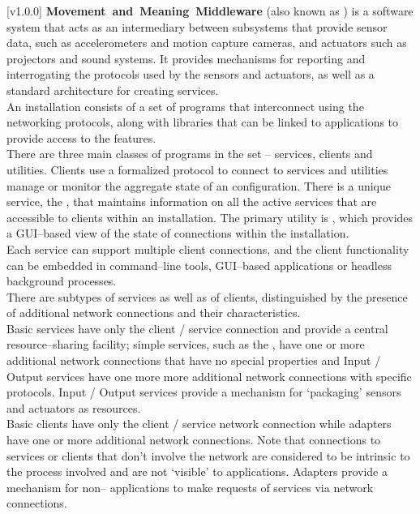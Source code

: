 [v1.0.0]
\textbf{Movement~and~Meaning~Middleware} (also known as \mplusm{}) is a software system
that acts as an intermediary between subsystems that provide sensor data, such as
accelerometers and motion capture cameras, and actuators such as projectors and sound
systems.
It provides mechanisms for reporting and interrogating the protocols used by the sensors
and actuators, as well as a standard architecture for creating services.\\

An \mplusm{} installation consists of a set of programs that interconnect using the
 networking
protocols, along with libraries that can be linked to applications to provide access to
the \mplusm{} features.\\

There are three main classes of programs in the set -- services, clients and utilities.
Clients use a formalized protocol to connect to services and utilities manage or monitor
the aggregate state of an \mplusm{} configuration.
There is a unique service, the , that
maintains information on all the active services that are accessible to clients within an
\mplusm{} installation. The primary utility is
, which provides a GUI--based view of the
state of connections within the installation.\\

Each service can support multiple client connections, and the client functionality can be
embedded in command--line tools, GUI--based applications or headless background
processes.\\

There are subtypes of services as well as of clients, distinguished by the presence of
additional \yarp{} network connections and their characteristics.\\

Basic services have only the client / service \yarp{} connection and provide a central
resource--sharing facility; simple services, such as the
, have one or more additional \yarp{}
network connections that have no special properties and Input / Output services have one
more more additional \yarp{} network connections with specific protocols.
Input / Output services provide a mechanism for `packaging' sensors and actuators as
\mplusm{} resources.\\

Basic clients have only the client / service \yarp{} network connection while adapters
have one or more additional \yarp{} network connections. Note that connections to services
or clients that don't involve the \yarp{} network are considered to be intrinsic to the
process involved and are not `visible' to \mplusm{} applications. Adapters provide a
mechanism for non--\mplusm{} applications to make requests of \mplusm{} services via
\yarp{} network connections.
\primaryEnd{}
